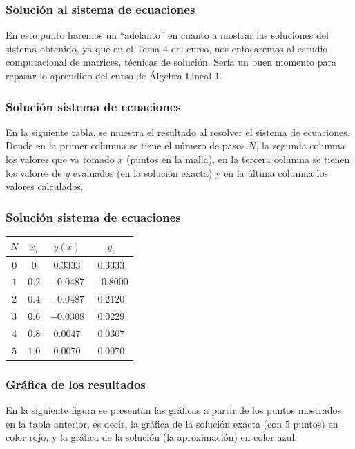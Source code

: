 \begin{frame}
\frametitle{Solución al sistema de ecuaciones}
En este punto haremos un \enquote{adelanto} en cuanto a mostrar las soluciones del sistema obtenido, ya que en el Tema 4 del curso, nos enfocaremos al estudio computacional de matrices, técnicas de solución. Sería un buen momento para repasar lo aprendido del curso de Álgebra Lineal 1.
\end{frame}
\begin{frame}
\frametitle{Solución sistema de ecuaciones}
En la siguiente tabla, se muestra el resultado al resolver el sistema de ecuaciones. Donde en la primer columna se tiene el número de pasos $N$, la segunda columna los valores que va tomado $x$ (puntos en la malla), en la tercera columna se tienen los valores de $y$ evaluados (en la solución exacta) y en la última columna los valores calculados.
\end{frame}
\begin{frame}
\frametitle{Solución sistema de ecuaciones}
\fontsize{12}{12}\selectfont
\begin{table}
\begin{tabular}{| c | c | c | c | } \hline
$N$ & $x_{i}$ & $y(x)$ & $y_{i}$ \\\hline
$0$ & $0$ & $0.3333$ & $0.3333$ \\\hline
$1$ & $0.2$ & $-0.0487$ & $-0.8000$ \\\hline
$2$ & $0.4$ & $-0.0487$ & $0.2120$ \\\hline
$3$ & $0.6$ & $-0.0308$ & $0.0229$ \\\hline
$4$ & $0.8$ & $0.0047$ & $0.0307$ \\\hline
$5$ & $1.0$ & $0.0070$ & $0.0070$ \\\hline
\end{tabular}
\end{table}
\end{frame}
\begin{frame}
\frametitle{Gráfica de los resultados}
En la siguiente figura se presentan las gráficas a partir de los puntos mostrados en la tabla anterior, es decir, la gráfica de la solución exacta (con $5$ puntos) en color rojo, y la gráfica de la solución (la aproximación) en color azul.
\end{frame}
